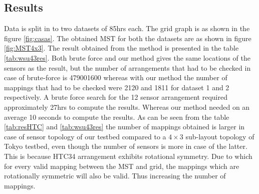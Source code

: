 \subsection{Results}
Data is split in to two datasets of 85hrs each. The grid graph is as shown in the figure \ref{fig:casas}. The obtained MST for both the datasets are as shown in figure \ref{fig:MST4x3}. The result obtained from the method is presented in the table \ref{tab:wsu43res}. Both brute force and our method gives the same locations of the sensors as the result, but the number of arrangements that had to be checked in case of brute-force is 479001600 whereas with our method the number of mappings that had to be checked were 2120 and 1811 for dataset 1 and 2 respectively. A brute force search for the 12 sensor arrangement required approximately 27hrs to compute the results. Whereas our method needed on an average 10 seconds to compute the results. As can be seen from the table \ref{tab:resHTC} and \ref{tab:wsu43res} the number of mappings obtained is larger in case of sensor topology of our testbed compared to a $4 \times 3$ sub-layout topology of Tokyo testbed, even though the number of sensors is more in case of the latter. This is because HTC34 arrangement exhibits rotational symmetry. Due to which for every valid mapping between the MST and grid, the mappings which are rotationally symmetric will also be valid. Thus increasing the number of mappings.
